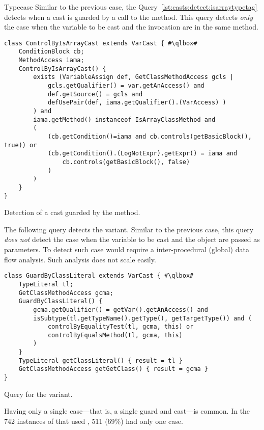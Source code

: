 \begin{pattern}{Typecase}
Similar to the previous case,
the Query~\ref{lst:casts:detect:isarraytypetag} detects when a cast is guarded by a call to the  method.
This query detects \emph{only} the case when the variable to be cast and
the  invocation are in the same method.

\begin{listing}
\begin{verbatim}
class ControlByIsArrayCast extends VarCast { #\qlbox#
	ConditionBlock cb;
	MethodAccess iama;
	ControlByIsArrayCast() {
		exists (VariableAssign def, GetClassMethodAccess gcls |
			gcls.getQualifier() = var.getAnAccess() and
			def.getSource() = gcls and
			defUsePair(def, iama.getQualifier().(VarAccess) )
		) and
		iama.getMethod() instanceof IsArrayClassMethod and
		(
			(cb.getCondition()=iama and cb.controls(getBasicBlock(), true)) or
			(cb.getCondition().(LogNotExpr).getExpr() = iama and
				cb.controls(getBasicBlock(), false)
			)
		)
	}
}
\end{verbatim}
\caption{Detection of a cast guarded by the  method.}
\label{lst:casts:detect:isarraytypetag}
\end{listing}

The following query detects the  variant.
Similar to the previous case,
this query \emph{does not} detect the case when the variable to be cast and the  object are passed as parameters.
To detect such case would require a inter-procedural (global) data flow analysis.
Such analysis does not scale easily.

\begin{listing}
\begin{verbatim}
class GuardByClassLiteral extends VarCast { #\qlbox#
	TypeLiteral tl;
	GetClassMethodAccess gcma;
	GuardByClassLiteral() {
		gcma.getQualifier() = getVar().getAnAccess() and
		isSubtype(tl.getTypeName().getType(), getTargetType()) and (
			controlByEqualityTest(tl, gcma, this) or
			controlByEqualsMethod(tl, gcma, this)
		)
	}
	TypeLiteral getClassLiteral() { result = tl }
	GetClassMethodAccess getGetClass() { result = gcma }
}
\end{verbatim}
\caption{Query for the  variant.}
\end{listing}


\issues{}
Having only a single case---that is, a single guard and cast---is common.
In the 742 instances of \thisp{} that used , 511
(69\%) had only one case.


\end{pattern}
